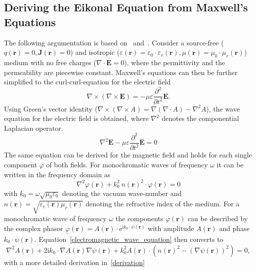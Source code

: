 \subsection{Deriving the Eikonal Equation from Maxwell's Equations}
The following argumentation is based on~\parencite{born_geometrische_1933} and~\parencite{sommerfeld_anwendung_1911}.
Consider a source-free (\(q(\bm{r}) = 0, \bm{J}(\bm{r}) = 0\)) and isotropic (\(\varepsilon(\bm{r}) = \varepsilon_0 \cdot \varepsilon_r(\bm{r}), \mu(\bm{r}) = \mu_0 \cdot \mu_r(\bm{r}) \)) medium with no free charges (\(\nabla \cdot \bm{E} = 0\)), where the permittivity and the permeability are piecewise constant.
Maxwell's equations can then be further simplified to the curl-curl-equation for the electric field
\begin{equation}
    \nabla \times (\nabla \times \bm{E}) = -\mu \varepsilon \frac{\partial^2}{\partial t^2} \bm{E}.
\end{equation}
Using Green's vector identity (\(\nabla \times (\nabla \times A) = \nabla(\nabla \cdot A) - \nabla^2 A\)), the wave equation for the electric field is obtained, where \(\nabla^2\) denotes the componential Laplacian operator.
\begin{equation}
    \nabla^2 \bm{E} - \mu \varepsilon \frac{\partial^2}{\partial t^2} \bm{E} = 0
\end{equation}
The same equation can be derived for the magnetic field and holds for each single component \(\varphi \) of both fields.
For monochromatic waves of frequency \(\omega \) it can be written in the frequency domain as
\begin{equation}\label{electromagnetic_wave_equation}
    \nabla^2 \varphi(\bm{r}) + k_0^2\ n{(\bm{r})}^2 \cdot \varphi(\bm{r}) = 0
\end{equation}
with \(k_0 = \omega \sqrt{\mu_0 \varepsilon_0} \) denoting the vacuum wave-number and \(n(\bm{r}) = \sqrt{\varepsilon_r(\bm{r}) \mu_r(\bm{r})}\) denoting the refractive index of the medium.
For a monochromatic wave of frequency \(\omega \) the components \(\varphi(\bm{r})\) can be described by the complex phasor \(\underline{\varphi}(\bm{r}) = A(\bm{r}) \cdot \mathrm{e}^{\mathrm{i} k_0 \cdot \psi(\bm{r})}\) with amplitude \(A(\bm{r})\) and phase \(k_0 \cdot \psi(\bm{r})\).
Equation~\eqref{electromagnetic_wave_equation} then converts to 
\begin{equation}\label{electromagnetic_wave_equation_complex}
    \nabla^2 A(\bm{r}) + 2\mathrm{i}k_0 \cdot \nabla A(\bm{r}) \nabla \psi(\bm{r}) + k_0^2 A(\bm{r}) \cdot ({n(\bm{r})}^2 - {(\nabla \psi(\bm{r}))}^2) = 0,
\end{equation}
with a more detailed derivation in~\ref{derivation}

